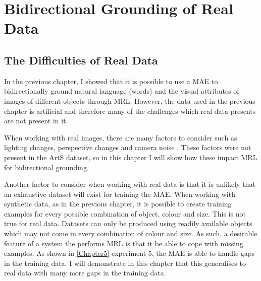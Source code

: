 
\chapter{Bidirectional Grounding of Real Data} %

\label{Chapter6} %


\section{The Difficulties of Real Data}
In the previous chapter, I showed that it is possible to use a \ac{MAE} to bidirectionally ground natural language (words) and the visual attributes of images of different objects through \ac{MRL}. However, the data used in the previous chapter is artificial and therefore many of the challenges which real data presents are not present in it. 

When working with real images, there are many factors to consider such as lighting changes, perspective changes and camera noise \cite{keller2016analysis}. These factors were not present in the ArtS dataset, so in this chapter I will show how these impact \ac{MRL} for bidirectional grounding.

Another factor to consider when working with real data is that it is unlikely that an exhaustive dataset will exist for training the \ac{MAE}. When working with synthetic data, as in the previous chapter, it is possible to create training examples for every possible combination of object, colour and size. This is not true for real data. Datasets can only be produced using readily available objects which may not come in every combination of colour and size. As such, a desirable feature of a system the performs \ac{MRL} is that it be able to cope with missing examples. As shown in \autoref{Chapter5} experiment 5, the \ac{MAE} is able to handle gaps in the training data. I will demonstrate in this chapter that this generalises to real data with many more gaps in the training data.



